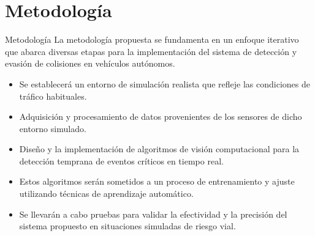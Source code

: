 \documentclass[8pt]{beamer}
\begin{document}
    
    \section{Metodología}
    \begin{frame}{Metodología}
        La metodología propuesta se fundamenta en un enfoque iterativo que abarca diversas etapas para la implementación del sistema de detección
        y evasión de colisiones en vehículos autónomos.
    \begin{itemize}
        
        \item Se establecerá un entorno de simulación realista que refleje las condiciones de tráfico habituales.
        \item Adquisición y procesamiento de datos provenientes de los sensores de dicho entorno simulado.
        \item Diseño y la implementación de algoritmos de visión computacional para la detección temprana de eventos críticos en tiempo real.
        \item Estos algoritmos serán sometidos a un proceso de entrenamiento y ajuste utilizando técnicas de aprendizaje automático.
        \item Se llevarán a cabo pruebas para validar la efectividad y la precisión del sistema propuesto en situaciones simuladas de riesgo vial.
    \end{itemize}
    \end{frame}
    
    
\end{document}
